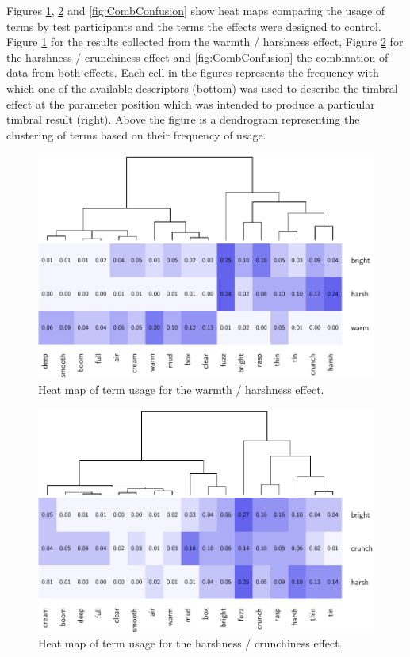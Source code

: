 			Figures \ref{fig:HarshConfusion}, \ref{fig:CrunchConfusion} and \ref{fig:CombConfusion} show heat
			maps comparing the usage of terms by test participants and the terms the effects were designed to
			control. Figure \ref{fig:HarshConfusion} for the results collected from the warmth / harshness
			effect, Figure \ref{fig:CrunchConfusion} for the harshness / crunchiness effect and
			\ref{fig:CombConfusion} the combination of data from both effects. Each cell in the figures
			represents the frequency with which one of the available descriptors (bottom) was used to describe
			the timbral effect at the parameter position which was intended to produce a particular timbral
			result (right). Above the figure is a dendrogram representing the clustering of terms based on
			their frequency of usage.

			\begin{figure}[h!]
				\centering
				\includegraphics{chapter7/Images/HarshConfusion.pdf}
				\caption{Heat map of term usage for the warmth / harshness effect.}
				\label{fig:HarshConfusion}
			\end{figure}

			\begin{figure}[h!]
				\centering
				\includegraphics{chapter7/Images/CrunchConfusion.pdf}
				\caption{Heat map of term usage for the harshness / crunchiness effect.}
				\label{fig:CrunchConfusion}
			\end{figure}

